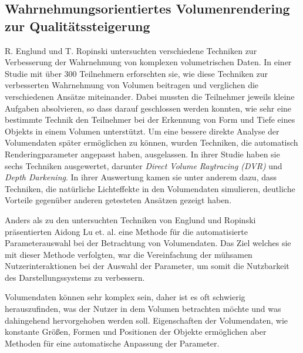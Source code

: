 \subsection{Wahrnehmungsorientiertes Volumenrendering zur Qualitätssteigerung}\label{ss::wovrzq}
R. Englund und T. Ropinski \cite{doi:10.1111/cgf.13320} untersuchten verschiedene Techniken zur Verbesserung der Wahrnehmung von komplexen volumetrischen Daten.
In einer Studie mit über 300 Teilnehmern erforschten sie, wie diese Techniken zur verbesserten Wahrnehmung von Volumen beitragen und verglichen die verschiedenen Ansätze miteinander.
Dabei mussten die Teilnehmer jeweils kleine Aufgaben absolvieren, so dass darauf geschlossen werden konnten, wie sehr eine bestimmte Technik den Teilnehmer bei der Erkennung von Form und Tiefe eines Objekts in einem Volumen unterstützt.
Um eine bessere direkte Analyse der Volumendaten später ermöglichen zu können, wurden Techniken, die automatisch Renderingparameter angepasst haben, ausgelassen.
In ihrer Studie haben sie sechs Techniken ausgewertet, darunter \emph{Direct Volume Raytracing (DVR)} und \emph{Depth Darkening}.
In ihrer Auswertung kamen sie unter anderem dazu, dass Techniken, die natürliche Lichteffekte in den Volumendaten simulieren, deutliche Vorteile gegenüber anderen getesteten Ansätzen gezeigt haben.

Anders als zu den untersuchten Techniken von Englund und Ropinski \cite{doi:10.1111/cgf.13320} präsentierten Aidong Lu et. al. \cite{Lu:2006:VCU:2384796.2384814} eine Methode für die automatisierte Parameterauswahl bei der Betrachtung von Volumendaten.
Das Ziel welches sie mit dieser Methode verfolgten, war die Vereinfachung der mühsamen Nutzerinteraktionen bei der Auswahl der Parameter, um somit die Nutzbarkeit des Darstellungssystems zu verbessern.

Volumendaten können sehr komplex sein, daher ist es oft schwierig herauszufinden, was der Nutzer in dem Volumen betrachten möchte und was dahingehend hervorgehoben werden soll.
Eigenschaften der Volumendaten, wie konstante Größen, Formen und Positionen der Objekte ermöglichen aber Methoden für eine automatische Anpassung der Parameter.

